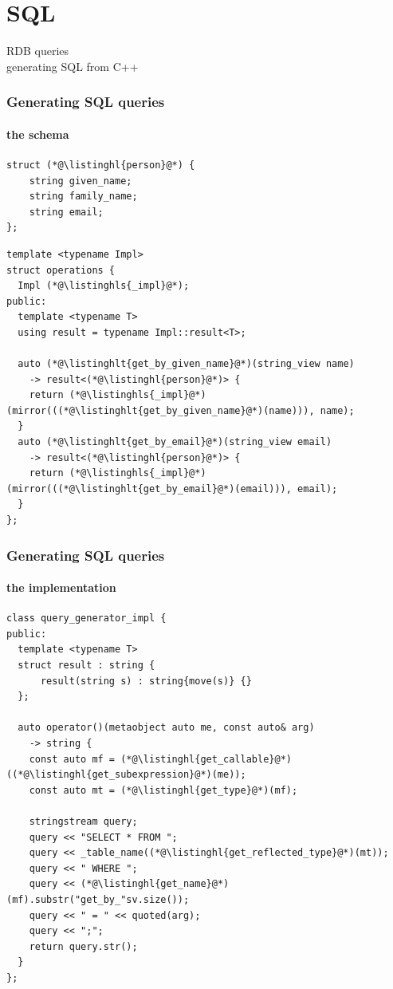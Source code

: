 \documentclass[compress,table,xcolor=table]{beamer}
\begin{document}
\section{SQL}
\begin{frame}[c]
  \Huge
  \centering
  RDB queries\\
  \Large
  generating SQL from C++
\end{frame}
\begin{frame}[fragile]
  \frametitle{Generating SQL queries}
  \framesubtitle{the schema}
  \begin{lstlisting}[language=c++2x,basicstyle=\scriptsize\ttfamily]
struct (*@\listinghl{person}@*) {
    string given_name;
    string family_name;
    string email;
};
  \end{lstlisting}
  \begin{lstlisting}[language=c++2x,basicstyle=\scriptsize\ttfamily]
template <typename Impl>
struct operations {
  Impl (*@\listinghls{_impl}@*);
public:
  template <typename T>
  using result = typename Impl::result<T>;

  auto (*@\listinghlt{get_by_given_name}@*)(string_view name)
    -> result<(*@\listinghl{person}@*)> {
    return (*@\listinghls{_impl}@*)(mirror(((*@\listinghlt{get_by_given_name}@*)(name))), name);
  }
  auto (*@\listinghlt{get_by_email}@*)(string_view email)
    -> result<(*@\listinghl{person}@*)> {
    return (*@\listinghls{_impl}@*)(mirror(((*@\listinghlt{get_by_email}@*)(email))), email);
  }
};
  \end{lstlisting}
\end{frame}
\begin{frame}[fragile]
  \frametitle{Generating SQL queries}
  \framesubtitle{the implementation}
  \begin{lstlisting}[language=c++2x,basicstyle=\scriptsize\ttfamily]
class query_generator_impl {
public:
  template <typename T>
  struct result : string {
      result(string s) : string{move(s)} {}
  };

  auto operator()(metaobject auto me, const auto& arg)
    -> string {
    const auto mf = (*@\listinghl{get_callable}@*)((*@\listinghl{get_subexpression}@*)(me));
    const auto mt = (*@\listinghl{get_type}@*)(mf);

    stringstream query;
    query << "SELECT * FROM ";
    query << _table_name((*@\listinghl{get_reflected_type}@*)(mt));
    query << " WHERE ";
    query << (*@\listinghl{get_name}@*)(mf).substr("get_by_"sv.size());
    query << " = " << quoted(arg);
    query << ";";
    return query.str();
  }
};
  \end{lstlisting}
\end{frame}
\end{document}
